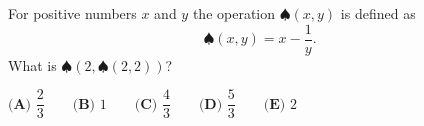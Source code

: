 For positive numbers $x$ and $y$ the operation $\spadesuit(x,y)$ is defined as
\[\spadesuit(x,y)=x-\dfrac{1}{y}.\]
What is $\spadesuit\left(2,\spadesuit(2,2)\right)$?

$\textbf{(A) }\dfrac{2}{3}\qquad\textbf{(B) }1\qquad\textbf{(C) }\dfrac{4}{3}\qquad\textbf{(D) }\dfrac{5}{3}\qquad\textbf{(E) }2$
